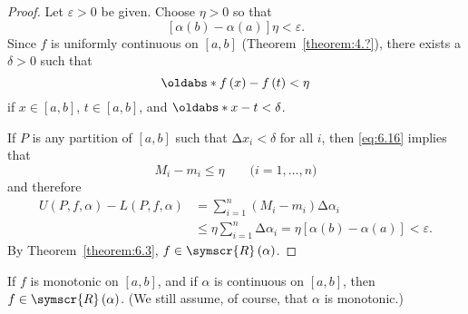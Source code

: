 \begin{proof}
    Let \(\varepsilon>0\) be given. Choose \(\eta>0\) so that
    \begin{equation*}
        \left[\alpha\left(b\right)-\alpha\left(a\right)\right]\eta<\varepsilon.
    \end{equation*}
    Since \(f\) is uniformly continuous on \(\left[a,b\right]\) (Theorem~\ref{theorem:4.?}), there exists a \(\delta>0\) such that
    \begin{equation}
        \abs[f\left(x\right)-f\left(t\right)]<\eta\label{eq:6.16}
    \end{equation}
    if \(x\in\left[a,b\right]\), \(t\in\left[a,b\right]\), and \(\abs[x-t]<\delta\).

    If \(P\) is any partition of \(\left[a,b\right]\) such that \(\increment x_i<\delta\) for all \(i\),  then \eqref{eq:6.16} implies that
    \begin{equation}
        M_i-m_i\leqslant\eta\qquad\text{(\(i=1,\ldots,n\))}
    \end{equation}
    and therefore
    \begin{align*}
        U\left(P,f,\alpha\right)-L\left(P,f,\alpha\right)&=\sum_{i=1}^n\left(M_i-m_i\right)\increment\alpha_i\\
        &\leqslant\eta\sum_{i=1}^n\increment\alpha_i=\eta\left[\alpha\left(b\right)-\alpha\left(a\right)\right]<\varepsilon.
    \end{align*}
    By Theorem~\ref{theorem:6.3}, \(f\in\symscr{R}\left(\alpha\right)\).
\end{proof}

\begin{theorem}
    If \(f\) is monotonic on \(\left[a,b\right]\), and if \(\alpha\) is continuous on \(\left[a,b\right]\), then \(f\in\symscr{R}\left(\alpha\right)\). (We still assume, of course, that \(\alpha\) is monotonic.)
\end{theorem}

